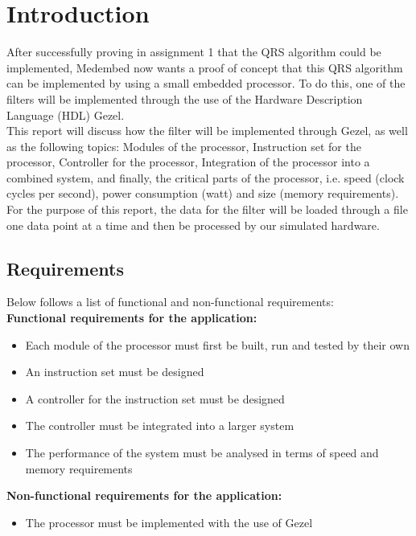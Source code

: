 \documentclass[12pt,a4paper]{article}
\begin{document}
\section{Introduction}
	After successfully proving in assignment 1 that the QRS algorithm could be implemented, Medembed now wants a proof of concept that this QRS algorithm can be implemented by using a small embedded processor. To do this, one of the filters will be implemented through the use of the Hardware Description Language (HDL) Gezel.\\
	This report will discuss how the filter will be implemented through Gezel, as well as the following topics: Modules of the processor, Instruction set for the processor, Controller for the processor, Integration of the processor into a combined system, and finally, the critical parts of the processor, i.e. speed (clock cycles per second), power consumption (watt) and size (memory requirements).\\
	For the purpose of this report, the data for the filter will be loaded through a file one data point at a time and then be processed by our simulated hardware.\\
	
\subsection{Requirements}
Below follows a list of functional and non-functional requirements:\\

\textbf{ Functional requirements for the application:}
\begin{itemize}
	\item Each module of the processor must first be built, run and tested by their own
	\item An instruction set must be designed
	\item A controller for the instruction set must be designed
	\item The controller must be integrated into a larger system
	\item The performance of the system must be analysed in terms of speed and memory requirements

\end{itemize}
\textbf{Non-functional requirements for the application:}
\begin {itemize}
	\item The processor must be implemented with the use of Gezel
\end{itemize}
\end{document}
